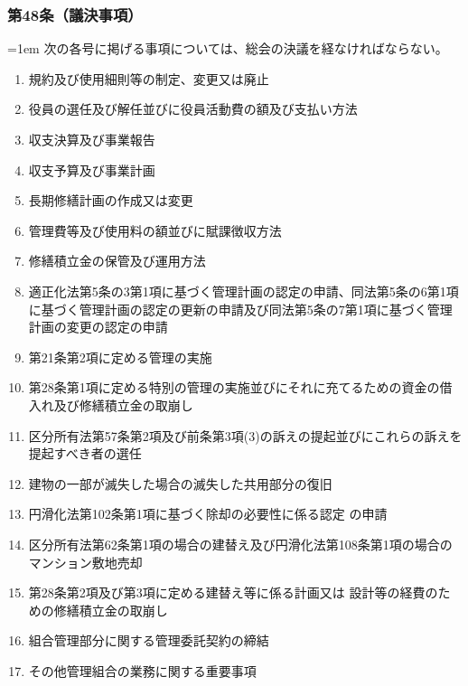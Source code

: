 \documentclass[
  twoside,
  luatex,
  paper=a4paper,
  fontsize=11pt,
  jafontsize=11pt,
  jlreq_notes,
]{jlreq}
\newcommand{\joumain}[1]{%
  \noindent\hangindent=1em\hangafter=1
  \hspace{1em}#1%
}
\begin{document}
  \subsubsection*{第48条（議決事項）}
  \joumain{次の各号に掲げる事項については、総会の決議を経なければならない。}
  \begin{enumerate}
    \item 規約及び使用細則等の制定、変更又は廃止
    \item 役員の選任及び解任並びに役員活動費の額及び支払い方法
    \item 収支決算及び事業報告
    \item 収支予算及び事業計画
    \item 長期修繕計画の作成又は変更
    \item 管理費等及び使用料の額並びに賦課徴収方法
    \item 修繕積立金の保管及び運用方法
    \item 適正化法第5条の3第1項に基づく管理計画の認定の申請、同法第5条の6第1項に基づく管理計画の認定の更新の申請及び同法第5条の7第1項に基づく管理計画の変更の認定の申請
    \item 第21条第2項に定める管理の実施
    \item 第28条第1項に定める特別の管理の実施並びにそれに充てるための資金の借入れ及び修繕積立金の取崩し
    \item 区分所有法第57条第2項及び前条第3項(3)の訴えの提起並びにこれらの訴えを提起すべき者の選任
    \item 建物の一部が滅失した場合の滅失した共用部分の復旧
    \item 円滑化法第102条第1項に基づく除却の必要性に係る認定 の申請
    \item 区分所有法第62条第1項の場合の建替え及び円滑化法第108条第1項の場合のマンション敷地売却
    \item 第28条第2項及び第3項に定める建替え等に係る計画又は 設計等の経費のための修繕積立金の取崩し
    \item 組合管理部分に関する管理委託契約の締結
    \item その他管理組合の業務に関する重要事項
  \end{enumerate}
\end{document}
